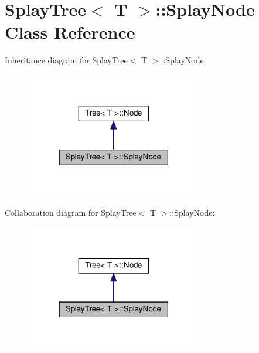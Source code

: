 \hypertarget{classSplayTree_1_1SplayNode}{}\section{Splay\+Tree$<$ T $>$\+:\+:Splay\+Node Class Reference}
\label{classSplayTree_1_1SplayNode}


Inheritance diagram for Splay\+Tree$<$ T $>$\+:\+:Splay\+Node\+:
\nopagebreak
\begin{figure}[H]
\begin{center}
\leavevmode
\includegraphics[width=219pt]{classSplayTree_1_1SplayNode__inherit__graph}
\end{center}
\end{figure}


Collaboration diagram for Splay\+Tree$<$ T $>$\+:\+:Splay\+Node\+:
\nopagebreak
\begin{figure}[H]
\begin{center}
\leavevmode
\includegraphics[width=219pt]{classSplayTree_1_1SplayNode__coll__graph}
\end{center}
\end{figure}
